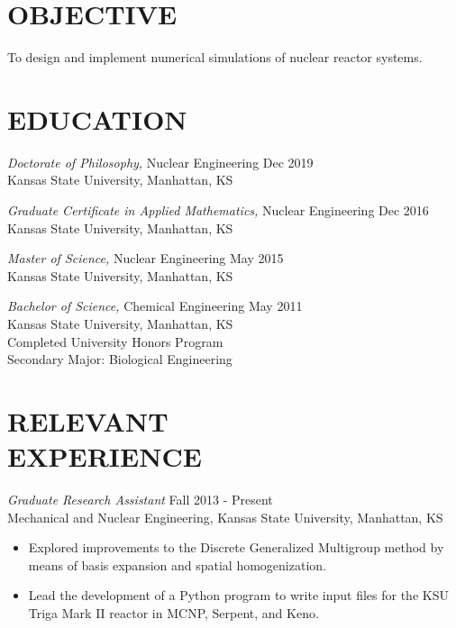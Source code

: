 \documentclass[margin, 10pt]{res} %
\begin{document}
\begin{resume}

\section{OBJECTIVE}

To design and implement numerical simulations of nuclear reactor systems.

\section{EDUCATION}

{\sl Doctorate of Philosophy,} Nuclear Engineering \hfill Dec 2019\\
Kansas State University, Manhattan, KS

{\sl Graduate Certificate in Applied Mathematics,} Nuclear Engineering \hfill Dec 2016\\
Kansas State University, Manhattan, KS

{\sl Master of Science,} Nuclear Engineering \hfill May 2015\\
Kansas State University, Manhattan, KS

{\sl Bachelor of Science,} Chemical Engineering \hfill May 2011 \\
Kansas State University, Manhattan, KS \\
Completed University Honors Program \\
Secondary Major: Biological Engineering

\section{RELEVANT \\ EXPERIENCE}

{\sl Graduate Research Assistant} \hfill Fall 2013 - Present \\
Mechanical and Nuclear Engineering, Kansas State University, Manhattan, KS
\begin{itemize}
    \item Explored improvements to the Discrete Generalized Multigroup method by means of basis expansion and spatial homogenization.
    \item Lead the development of a Python program to write input files for the KSU Triga Mark II reactor in MCNP, Serpent, and Keno.
\end{itemize}


\end{resume}
\end{document}
